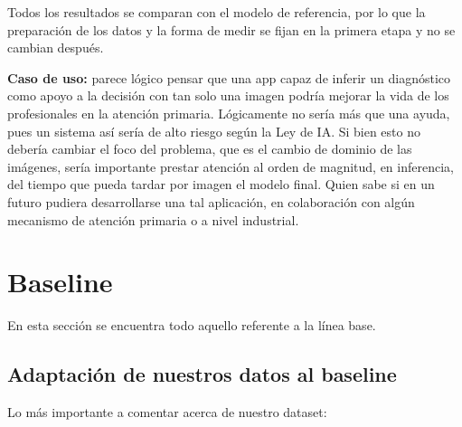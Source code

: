 \documentclass[10pt,a4paper]{article}
\renewcommand{\_}{\guionbajo\allowbreak}
\begin{document}
\noindent Todos los resultados se comparan con el modelo de referencia, por lo que la
preparación de los datos y la forma de medir se fijan en la primera etapa y no se cambian después.

\medskip

\noindent \textbf{Caso de uso:} parece lógico pensar que una app capaz de inferir un diagnóstico como apoyo a la decisión
con tan solo una imagen podría mejorar la vida de los profesionales en la atención primaria. Lógicamente 
no sería más que una ayuda, pues un sistema así sería de alto riesgo según la Ley de IA. Si bien esto no debería 
cambiar el foco del problema, que es el cambio de dominio de las imágenes, sería importante prestar atención al orden de 
magnitud, en inferencia, del tiempo que pueda tardar por imagen el modelo final. Quien sabe si en un futuro pudiera 
desarrollarse una tal aplicación, en colaboración con algún mecanismo de atención primaria o a nivel industrial. 

\newpage

\section{Baseline}
\label{sec:baseline}

\noindent En esta sección se encuentra todo aquello referente a la línea base.

\subsection{Adaptación de nuestros datos al baseline}
\label{subsec:adaptacion}

\noindent Lo más importante a comentar acerca de nuestro dataset:
\end{document}
